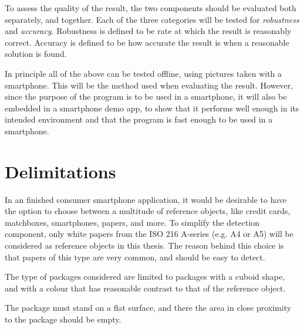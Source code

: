 To assess the quality of the result, the two components should be evaluated both separately, and together. 
Each of the three categories will be tested for \textit{robustness} and \textit{accuracy}.
Robustness is defined to be rate at which the result is reasonably correct.
Accuracy is defined to be how accurate the result is when a reasonable solution is found.

In principle all of the above can be tested offline, using pictures taken with a smartphone.
This will be the method used when evaluating the result.
However, since the purpose of the program is to be used in a smartphone, it will also be embedded in a smartphone demo app, to show that it performs well enough in its intended environment and that the program is fast enough to be used in a smartphone.

\section{Delimitations}
In an finished consumer smartphone application, it would be desirable to have the option to choose between a multitude of reference objects, like credit cards, matchboxes, smartphones, papers, and more. 
To simplify the detection component, only white papers from the ISO 216 A-series (e.g. A4 or A5) will be considered as reference objects in this thesis.
The reason behind this choice is that papers of this type are very common, and should be easy to detect.

The type of packages considered are limited to packages with a cuboid shape, and with a colour that has reasonable contrast to that of the reference object.

The package must stand on a flat surface, and there the area in close proximity to the package should be empty.


